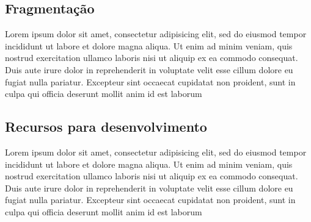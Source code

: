 
\subsection{Fragmentação}

Lorem ipsum dolor sit amet, consectetur adipisicing elit, sed do eiusmod tempor incididunt ut labore et dolore magna aliqua. Ut enim ad minim veniam, quis nostrud exercitation ullamco laboris nisi ut aliquip ex ea commodo consequat. Duis aute irure dolor in reprehenderit in voluptate velit esse cillum dolore eu fugiat nulla pariatur.  Excepteur sint occaecat cupidatat non proident, sunt in culpa qui officia deserunt mollit anim id est laborum

\subsection{Recursos para desenvolvimento}

Lorem ipsum dolor sit amet, consectetur adipisicing elit, sed do eiusmod tempor incididunt ut labore et dolore magna aliqua. Ut enim ad minim veniam, quis nostrud exercitation ullamco laboris nisi ut aliquip ex ea commodo consequat. Duis aute irure dolor in reprehenderit in voluptate velit esse cillum dolore eu fugiat nulla pariatur.  Excepteur sint occaecat cupidatat non proident, sunt in culpa qui officia deserunt mollit anim id est laborum
